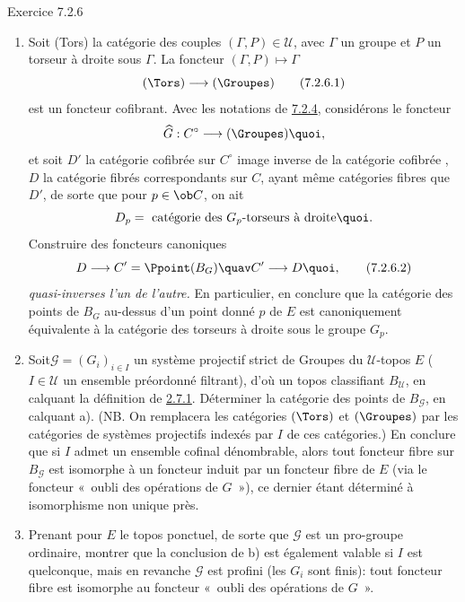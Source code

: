 \begin{enonce*}[remark]{Exercice 7.2.6}
\begin{enumerate}
\renewcommand{\theenumi}{\alph{enumi}}
\renewcommand{\labelenumi}{\theenumi)}
\item Soit (Tors) la catégorie des couples $(\Gamma,P)\in 𝒰$,
avec $\Gamma$ un groupe et $P$ un torseur à droite sous $\Gamma$. La
foncteur $(\Gamma,P)\mapsto \Gamma$
\begin{equation*}
(\Tors)\longrightarrow (\Groupes)\tag{7.2.6.1}
\end{equation*}
est un foncteur cofibrant. Avec les notations de \hyperref[IV.rem7.2.4]{7.2.4},
considérons le foncteur
$$
\widehat{G}:C^{\circ}\longrightarrow (\Groupes){\quoi},
$$
et soit $D'$ la catégorie cofibrée sur $C^{\circ}$ image inverse de
la catégorie cofibrée , $D$ la
catégorie fibrés
correspondants sur $C$, ayant même catégories fibres que $D'$, de
sorte que pour $p\in \ob C$, on ait
$$
D_p=\mbox{ catégorie des $G_p$-torseurs à droite}{\quoi}.
$$
Construire des foncteurs canoniques
\begin{equation*}
D\longrightarrow C'=\Ppoint(B_G)\quav C'\longrightarrow
D{\quoi},\tag{7.2.6.2}
\end{equation*}
\emph{quasi-inverses l'un de l'autre.} En particulier, en conclure
que la catégorie des points de $B_G$ au-dessus d'un point donné $p$
de $E$ est canoniquement équivalente à la catégorie des torseurs à
droite sous le groupe $G_p$.

\item Soit\pageoriginale $𝒢=(G_i)_{i\in I}$ un système
projectif strict de Groupes du $𝒰$-topos $E$ ($I\in
𝒰$ un ensemble préordonné filtrant), d'où un topos
classifiant $B_{𝒰}$, en calquant la définition de
\hyperref[IV.subsubsec2.7.1]{2.7.1}. Déterminer la catégorie des points de
$B_{𝒢}$, en calquant a). (NB. On remplacera les catégories
$(\Tors)$ et $(\Groupes)$ par les catégories de systèmes projectifs
indexés par $I$ de ces catégories.) En conclure que si $I$ admet un
ensemble cofinal dénombrable, alors tout foncteur fibre sur
$B_{𝒢}$ est isomorphe à un foncteur induit par un foncteur
fibre de $E$ (via le foncteur « oubli des opérations de $G$ »),
ce dernier étant déterminé à isomorphisme non unique près.

\item Prenant pour $E$ le topos ponctuel, de sorte que $𝒢$ est
un pro-groupe ordinaire, montrer que la conclusion de b) est
également valable si $I$ est quelconque, mais en revanche
$𝒢$ est profini (\ie les $G_i$ sont finis): tout foncteur
fibre est isomorphe au foncteur « oubli des opérations de $G$ ».


\end{enumerate}
\end{enonce*}
